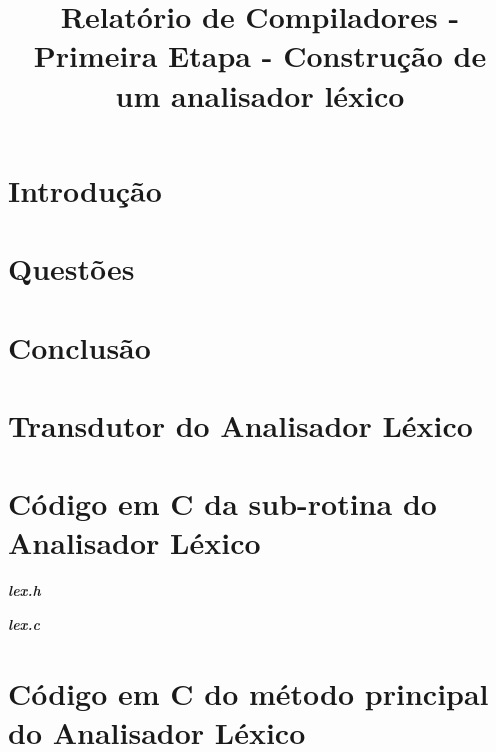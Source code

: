 \documentclass[12pt,oneside,a4paper,english]{abntex2}
\title{Relatório de Compiladores - Primeira Etapa - Construção de um analisador léxico}
\begin{document}
\frenchspacing %

\imprimircapa
\imprimirfolhaderosto

\clearpage
\begin{resumo}
	
\end{resumo}

\tableofcontents

\textual

\chapter{Introdução}
\label{chap:introducao}
	

\chapter{Questões}
\label{chap:questoes}
	

\chapter{Conclusão}
\label{chap:conclusao}
	



\begin{apendicesenv} %

\partapendices

\chapter{Transdutor do Analisador Léxico}
\label{app:transdutor}


\chapter{Código em C da sub-rotina do Analisador Léxico}
\label{app:codigo-lexico}
\textbf{\emph{lex.h}}

\textbf{\emph{lex.c}}


\chapter{Código em C do método principal do Analisador Léxico}
\label{app:codigo-principal}


\end{apendicesenv}
\end{document}
